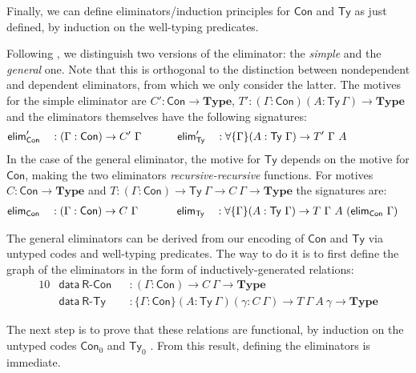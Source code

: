 \documentclass[autoref]{llncs}
\newcommand{\GG}{\Gamma}
\newcommand{\mType}{\mathbf{Type}}
\begin{document}
Finally, we can define eliminators/induction principles for $\textsf{Con}$ and
$\textsf{Ty}$ as just defined, by induction on the well-typing predicates.

Following \cite{ii}, we distinguish two versions of the eliminator:
the \emph{simple} and the \emph{general} one. Note that this is orthogonal to the
distinction between nondependent and dependent eliminators, from which
we only consider the latter. The motives for the simple eliminator are
$C':\textsf{Con}\to\mType$,
$T':(\GG:\textsf{Con})(A:\textsf{Ty}\,\GG)\to \mType$ and the
eliminators themselves have the following signatures:
\begin{alignat*}{10}
  & \textsf{elim}_{\textsf{Con}}' && : (\GG : \textsf{Con}) \to C'\ \GG \hspace{3.3em} \textsf{elim}_{\textsf{Ty}}' && : \forall\{\GG\} (A : \textsf{Ty}\ \GG) \to T'\ \GG\ A \hphantom{(\textsf{elim}_{\textsf{Con}}\ \GG)}
\end{alignat*}
In the case of the general eliminator, the motive for $\textsf{Ty}$
depends on the motive for $\textsf{Con}$, making the two eliminators
\emph{recursive-recursive} functions. For motives $C :
\textsf{Con} \to \mType$ and $T : (\GG : \textsf{Con}) \to
\textsf{Ty}\ \GG \to C\ \GG \to \mType$ the signatures are:
\begin{alignat*}{10}
  & \textsf{elim}_{\textsf{Con}} && : (\GG : \textsf{Con}) \to C\ \GG \hphantom{'}\hspace{3.3em} \textsf{elim}_{\textsf{Ty}} && : \forall\{\GG\} (A : \textsf{Ty}\ \GG) \to T\ \GG\ A\ (\textsf{elim}_{\textsf{Con}}\ \GG)
\end{alignat*}

The general eliminators can be derived from our encoding of $\textsf{Con}$ and $\textsf{Ty}$ via
untyped codes and well-typing predicates. The way to do it is to first define
the graph of the eliminators in the form of inductively-generated relations:
{\small\begin{alignat*}{10}
  & \textsf{data}\ \textsf{R-Con} && :
    (\GG : \textsf{Con}) \to C\ \GG \to \mType \\
  & \textsf{data}\ \textsf{R-Ty} && : \{\GG : \textsf{Con}\} (A : \textsf{Ty}\ \GG)
  (\gamma : C\ \GG)
  \to T\ \GG\ A\ \gamma
  \to \mType
\end{alignat*}}\vspace{-1em}

The next step is to prove that these relations are functional, by induction on
the untyped codes $\textsf{Con}_0$ and $\textsf{Ty}_0$ \cite{induction-is-enough}. From this result,
defining the eliminators is immediate.
\end{document}
